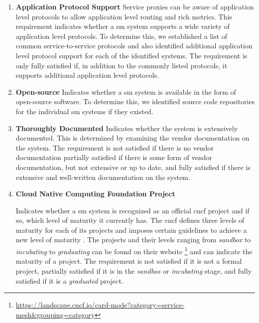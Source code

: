 \begin{enumerate}[label=\textbf{NFR\arabic*}, leftmargin=3\parindent]
    \item \textbf{Application Protocol Support}
    \label{nfr-1}
    Service proxies can be aware of application level protocols to allow application level routing and rich metrics. This requirement indicates whether a \gls{sm} system supports a wide variety of application level protocols. To determine this, we established a list of common service-to-service protocols and also identified additional application level protocol support for each of the identified systems. The requirement is only fully satisfied if, in addition to the commonly listed protocols, it supports additional application level protocols.

    \item \textbf{Open-source}
    \label{nfr-2}
    Indicates whether a \gls{sm} system is available in the form of open-source software. To determine this, we identified source code repositories for the individual \gls{sm} systems if they existed.
    
    \item \textbf{Thoroughly Documented}
    \label{nfr-3}
    Indicates whether the system is extensively documented. This is determined by examining the vendor documentation on the system. The requirement is not satisfied if there is no vendor documentation partially satisfied if there is some form of vendor documentation, but not extensive or up to date, and fully satisfied if there is extensive and well-written documentation on the system.
    
    \item \textbf{Cloud Native Computing Foundation Project}
    \label{nfr-4}
    
    Indicates whether a \gls{sm} system is recognized as an official \gls{cncf} project and if so, which level of maturity it currently has. The \gls{cncf} defines three levels of maturity for each of its projects and imposes certain guidelines to achieve a new level of maturity \cite{cncf-project-graduation-criteria}. The projects and their levels ranging from \textit{sandbox} to \textit{incubating} to \textit{graduating} can be found on their website \footnote{\url{https://landscape.cncf.io/card-mode?category=service-mesh&grouping=category}} and can indicate the maturity of a project. The requirement is not satisfied if it is not a formal project, partially satisfied if it is in the \textit{sandbox} or \textit{incubating} stage, and fully satisfied if it is a \textit{graduated} project.



\end{enumerate}
